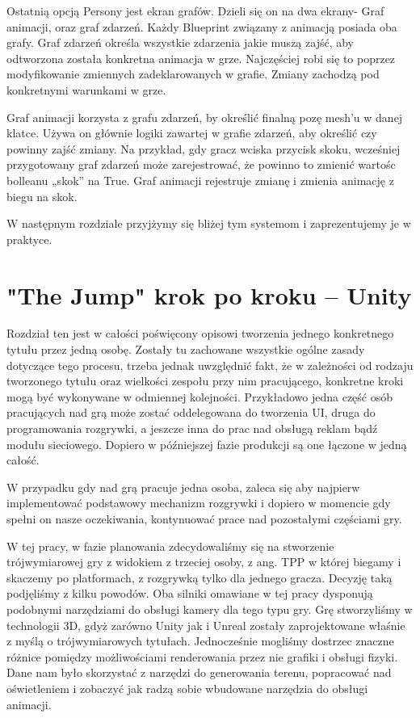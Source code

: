\documentclass[brudnopis]{xmgr}
\begin{document}
Ostatnią opcją Persony jest ekran grafów. Dzieli się on na dwa ekrany- Graf animacji, oraz graf zdarzeń. Każdy Blueprint związany z animacją posiada oba grafy.
Graf zdarzeń określa wszystkie zdarzenia jakie muszą zajść, aby odtworzona została konkretna animacja w grze. Najczęściej robi się to poprzez modyfikowanie zmiennych zadeklarowanych w grafie. Zmiany zachodzą pod konkretnymi warunkami w grze.

Graf animacji korzysta z grafu zdarzeń, by określić finalną pozę mesh’u w danej klatce. Używa on głównie logiki zawartej w grafie zdarzeń, aby określić czy powinny zajść zmiany. Na przykład, gdy gracz wciska przycisk skoku, wcześniej przygotowany graf zdarzeń może zarejestrować, że powinno to zmienić wartośc bolleanu „skok” na True.  Graf animacji rejestruje zmianę i zmienia animację z biegu na skok.

W następnym rozdziale przyjżymy się bliżej tym systemom i zaprezentujemy je w praktyce.

\chapter{"The Jump" krok po kroku -- Unity}

Rozdział ten jest w całości poświęcony opisowi tworzenia jednego konkretnego tytułu przez jedną osobę. Zostały tu zachowane wszystkie ogólne zasady dotyczące tego procesu, trzeba jednak uwzględnić fakt, że w zależności od rodzaju tworzonego tytułu oraz wielkości zespołu przy nim pracującego, konkretne kroki mogą być wykonywane w odmiennej kolejności. Przykładowo jedna część osób pracujących nad grą może zostać oddelegowana do tworzenia UI, druga do programowania rozgrywki, a jeszcze inna do prac nad obsługą reklam bądź modułu sieciowego. Dopiero w późniejszej fazie produkcji są one łączone w jedną całość. 

W przypadku gdy nad grą pracuje jedna osoba, zaleca się aby najpierw implementować podstawowy mechanizm rozgrywki i dopiero w momencie gdy spełni on nasze oczekiwania, kontynuować prace nad pozostałymi częściami gry.

W tej pracy, w fazie planowania zdecydowaliśmy się na stworzenie trójwymiarowej gry z widokiem z trzeciej osoby, z ang. TPP w której biegamy i skaczemy po platformach, z rozgrywką tylko dla jednego gracza. Decyzję taką podjęliśmy z kilku powodów. Oba silniki omawiane w tej pracy dysponują podobnymi narzędziami do obsługi kamery dla tego typu gry. Grę stworzyliśmy w technologii 3D, gdyż zarówno Unity jak i Unreal zostały zaprojektowane właśnie z myślą o trójwymiarowych tytułach. Jednocześnie mogliśmy dostrzec znaczne różnice pomiędzy możliwościami renderowania przez nie grafiki i obsługi fizyki. Dane nam było skorzystać z narzędzi do generowania terenu, popracować nad oświetleniem i zobaczyć jak radzą sobie wbudowane narzędzia do obsługi animacji.
\end{document}
